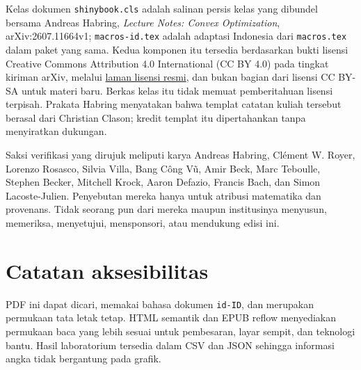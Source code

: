 \documentclass[indonesian]{shinybook}
\begin{document}
Kelas dokumen \texttt{shinybook.cls} adalah salinan persis kelas yang
dibundel bersama Andreas Habring, \emph{Lecture Notes: Convex Optimization},
arXiv:2607.11664v1; \texttt{macros-id.tex} adalah adaptasi Indonesia dari
\texttt{macros.tex} dalam paket yang sama. Kedua komponen itu tersedia
berdasarkan bukti lisensi Creative Commons Attribution 4.0 International
(CC BY 4.0) pada tingkat kiriman arXiv, melalui
\href{https://creativecommons.org/licenses/by/4.0/}{laman lisensi resmi}, dan
bukan bagian dari lisensi CC BY-SA untuk materi baru. Berkas kelas itu tidak
memuat pemberitahuan lisensi terpisah. Prakata Habring menyatakan bahwa templat
catatan kuliah tersebut berasal dari Christian Clason; kredit templat itu
dipertahankan tanpa menyiratkan dukungan.

Saksi verifikasi yang dirujuk meliputi karya Andreas Habring, Cl\'ement W.
Royer, Lorenzo Rosasco, Silvia Villa, Bang C\^ong V\~u, Amir Beck, Marc
Teboulle, Stephen Becker, Mitchell Krock, Aaron Defazio, Francis Bach, dan
Simon Lacoste-Julien. Penyebutan mereka hanya untuk atribusi matematika dan
provenans. Tidak seorang pun dari mereka maupun institusinya menyusun,
memeriksa, menyetujui, mensponsori, atau mendukung edisi ini.

\section*{Catatan aksesibilitas}
PDF ini dapat dicari, memakai bahasa dokumen \texttt{id-ID}, dan merupakan
permukaan tata letak tetap. HTML semantik dan EPUB reflow menyediakan
permukaan baca yang lebih sesuai untuk pembesaran, layar sempit, dan teknologi
bantu. Hasil laboratorium tersedia dalam CSV dan JSON sehingga informasi
angka tidak bergantung pada grafik.
\end{document}
